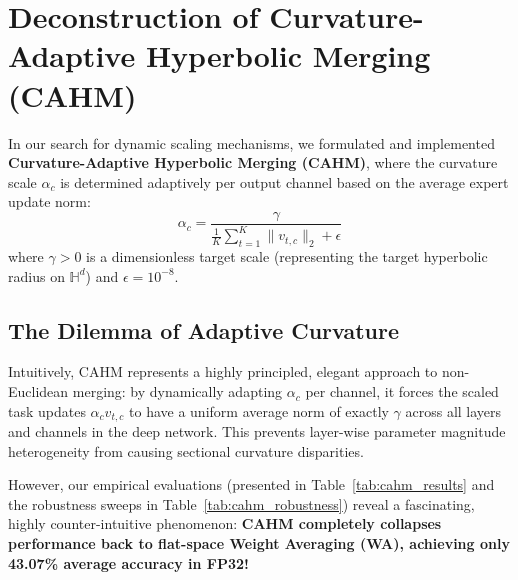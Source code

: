 \documentclass{article}
\theoremstyle{plain}
\theoremstyle{definition}
\theoremstyle{remark}
\begin{document}
\section{Deconstruction of Curvature-Adaptive Hyperbolic Merging (CAHM)}
In our search for dynamic scaling mechanisms, we formulated and implemented \textbf{Curvature-Adaptive Hyperbolic Merging (CAHM)}, where the curvature scale $\alpha_c$ is determined adaptively per output channel based on the average expert update norm:
$$\alpha_c = \frac{\gamma}{\frac{1}{K} \sum_{t=1}^K \|v_{t, c}\|_2 + \epsilon}$$
where $\gamma > 0$ is a dimensionless target scale (representing the target hyperbolic radius on $\mathbb{H}^d$) and $\epsilon = 10^{-8}$. 

\subsection{The Dilemma of Adaptive Curvature}
Intuitively, CAHM represents a highly principled, elegant approach to non-Euclidean merging: by dynamically adapting $\alpha_c$ per channel, it forces the scaled task updates $\alpha_c v_{t, c}$ to have a uniform average norm of exactly $\gamma$ across all layers and channels in the deep network. This prevents layer-wise parameter magnitude heterogeneity from causing sectional curvature disparities.

However, our empirical evaluations (presented in Table~\ref{tab:cahm_results} and the robustness sweeps in Table~\ref{tab:cahm_robustness}) reveal a fascinating, highly counter-intuitive phenomenon: \textbf{CAHM completely collapses performance back to flat-space Weight Averaging (WA), achieving only 43.07\% average accuracy in FP32!}
\end{document}
